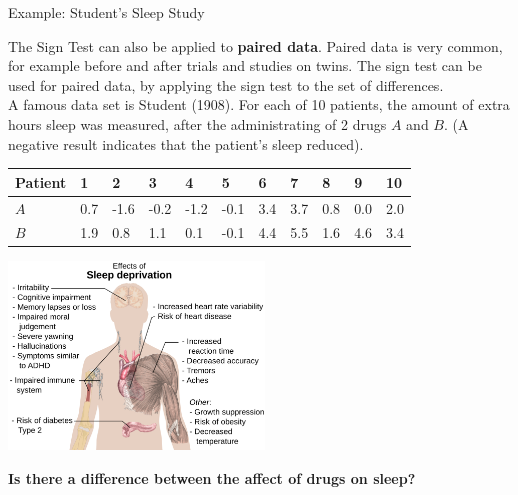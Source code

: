 \documentclass[t,xcolor=pdftex,dvipsnames,table]{beamer}
\begin{document}
\begin{frame}{Example: Student's Sleep Study}

The Sign Test can also be applied to {\bf paired data}. Paired data is very common, for example before and after trials and studies on twins. The sign test can be used for paired data, by applying the sign test to the set of differences. \\

\vspace{.5cm}
A famous data set is Student (1908). For each of 10 patients, the amount of extra hours sleep was measured, after the administrating of 2 drugs $A$ and $B$. (A negative result indicates that the patient’s sleep reduced).  \href{https://stat.ethz.ch/R-manual/R-devel/library/datasets/html/sleep.html}{}  \\

\vspace{.5cm}
{\small \begin{tabular}{lllllllllll} \hline
Patient & 1 & 2 & 3 & 4 & 5 & 6 & 7 & 8 & 9 & 10 \\ \hline
$A$ & 0.7 & -1.6 & -0.2 & -1.2 & -0.1 & 3.4 & 3.7 & 0.8 & 0.0 & 2.0 \\
$B$ & 1.9 & 0.8 & 1.1 & 0.1 & -0.1 & 4.4 & 5.5 & 1.6 & 4.6 & 3.4 \\  \hline
\end{tabular}}
\end{frame}

\begin{frame}{}

\begin{center}
\includegraphics[height=5cm]{../images/Sleep.png}
\end{center}

{\bf Is there a difference between the affect of drugs on sleep?}

\end{frame}
\end{document}
